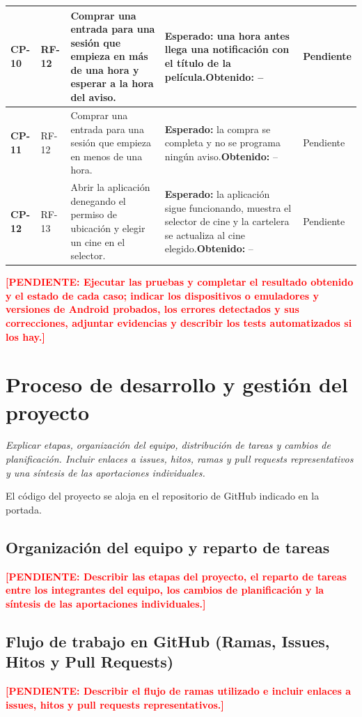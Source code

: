 \documentclass[11pt,a4paper]{article}
\newcommand{\pendiente}[1]{\textcolor{red}{\textbf{[PENDIENTE: #1]}}}
\begin{document}
\begin{longtable}{L{1.3cm} L{1.9cm} L{3.9cm} L{4.6cm} L{1.9cm}}
\midrule
\textbf{CP-10} & RF-12 & Comprar una entrada para una sesión que empieza en más de una hora y esperar a la hora del aviso. & \textbf{Esperado:} una hora antes llega una notificación con el título de la película.\newline \textbf{Obtenido:} -- & Pendiente \\
\midrule
\textbf{CP-11} & RF-12 & Comprar una entrada para una sesión que empieza en menos de una hora. & \textbf{Esperado:} la compra se completa y no se programa ningún aviso.\newline \textbf{Obtenido:} -- & Pendiente \\
\midrule
\textbf{CP-12} & RF-13 & Abrir la aplicación denegando el permiso de ubicación y elegir un cine en el selector. & \textbf{Esperado:} la aplicación sigue funcionando, muestra el selector de cine y la cartelera se actualiza al cine elegido.\newline \textbf{Obtenido:} -- & Pendiente \\
\end{longtable}

\pendiente{Ejecutar las pruebas y completar el resultado obtenido y el estado de cada caso; indicar los dispositivos o emuladores y versiones de Android probados, los errores detectados y sus correcciones, adjuntar evidencias y describir los tests automatizados si los hay.}

\section{Proceso de desarrollo y gestión del proyecto}
\textit{Explicar etapas, organización del equipo, distribución de tareas y cambios de planificación. Incluir enlaces a issues, hitos, ramas y pull requests representativos y una síntesis de las aportaciones individuales.}

El código del proyecto se aloja en el repositorio de GitHub indicado en la portada.

\subsection{Organización del equipo y reparto de tareas}
\pendiente{Describir las etapas del proyecto, el reparto de tareas entre los integrantes del equipo, los cambios de planificación y la síntesis de las aportaciones individuales.}

\subsection{Flujo de trabajo en GitHub (Ramas, Issues, Hitos y Pull Requests)}
\pendiente{Describir el flujo de ramas utilizado e incluir enlaces a issues, hitos y pull requests representativos.}
\end{document}
